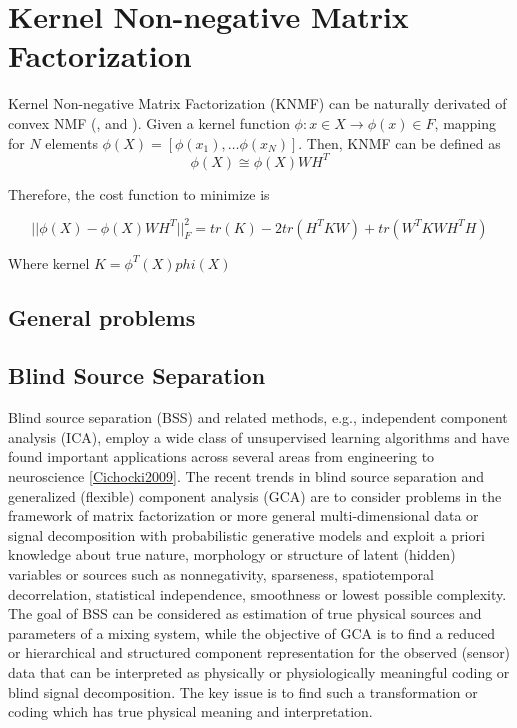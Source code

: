 \documentclass[letterpaper,12pt]{article}
\begin{document}
\section{Kernel Non-negative Matrix Factorization}

Kernel Non-negative Matrix Factorization (KNMF) can be naturally derivated of convex NMF (\cite{Kulis2006}, \cite{Li2005} and \cite{Rosipal2001}). Given a kernel function $\phi:x\in X \rightarrow \phi(x)\in F $, mapping for $N$ elements $\phi(X) = [ \phi(x_1),\ldots \phi(x_N) ]$. Then, KNMF can be defined as
\begin{equation}
 \phi(X)\cong\phi(X)WH^T
\end{equation}\label{eq:KNMF}

Therefore, the cost function to minimize is

\begin{equation}
 || \phi(X) - \phi(X)WH^T ||_F^2 = tr(K) - 2 tr(H^TKW)+tr(W^TKWH^TH)
\end{equation}

 Where kernel $K=\phi^T(X)phi(X)$
 
 

\subsection{General problems}


 \subsection{Blind Source Separation}
 
Blind source separation (BSS) and related methods, e.g., independent component analysis (ICA), employ a wide class of unsupervised learning algorithms and have found important applications across several areas from engineering to neuroscience \ref{Cichocki2009}. The recent trends in blind source separation and generalized (flexible) component analysis (GCA) are to consider problems in the framework of matrix factorization or more general multi-dimensional data or signal decomposition with probabilistic generative models and exploit a priori knowledge about true nature, morphology or structure of latent (hidden) variables or sources such as nonnegativity, sparseness, spatiotemporal decorrelation, statistical independence, smoothness or lowest possible complexity. The goal of BSS can be considered as estimation of true physical sources and parameters of a mixing system, while the objective of GCA is to find a reduced or hierarchical and structured component representation for the observed (sensor) data that can be interpreted as physically or physiologically meaningful coding or blind signal decomposition. The key issue is to find such a transformation or coding which has true physical meaning and interpretation.
\end{document}
